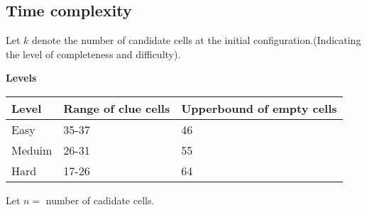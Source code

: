 \documentclass[12pt]{article}
\begin{document}
\subsection{Time complexity}
\begin{flushleft}
Let $k$ denote the number of candidate cells at the initial configuration.(Indicating the level of completeness and difficulty).\\


\begin{flushleft}
\textbf{Levels}
\end{flushleft}
{
\centering
\begin{longtable}{| p{3cm} | p{3cm}| p{3cm}| }
\hline
\textbf{Level} & \textbf{ Range of clue cells} & \textbf{Upperbound of empty cells}

	\\ \hline Easy & 35-37 & 46
	\\ \hline Meduim & 26-31 & 55
	\\ \hline Hard & 17-26 & 64
	\\ \hline
\end{longtable}
}
Let $n =$ number of cadidate cells.\\


\end{flushleft}
\end{document}
